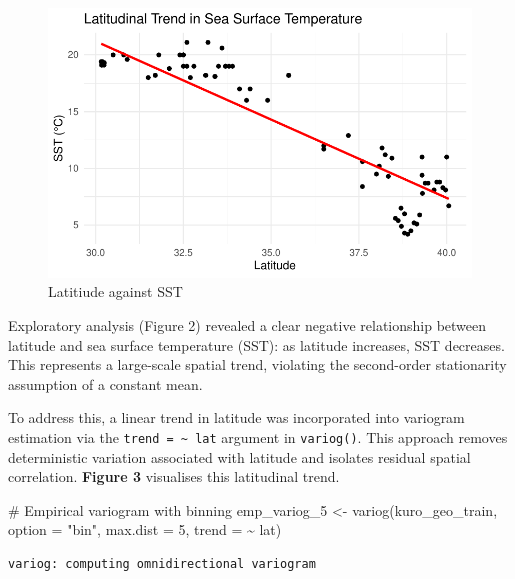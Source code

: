 \documentclass[
  11pt,
]{article}
\newenvironment{Shaded}{\begin{snugshade}}{\end{snugshade}}
\newcommand{\AttributeTok}[1]{\textcolor[rgb]{0.40,0.45,0.13}{#1}}
\newcommand{\CommentTok}[1]{\textcolor[rgb]{0.37,0.37,0.37}{#1}}
\newcommand{\DecValTok}[1]{\textcolor[rgb]{0.68,0.00,0.00}{#1}}
\newcommand{\FunctionTok}[1]{\textcolor[rgb]{0.28,0.35,0.67}{#1}}
\newcommand{\NormalTok}[1]{\textcolor[rgb]{0.00,0.23,0.31}{#1}}
\newcommand{\OtherTok}[1]{\textcolor[rgb]{0.00,0.23,0.31}{#1}}
\newcommand{\SpecialCharTok}[1]{\textcolor[rgb]{0.37,0.37,0.37}{#1}}
\newcommand{\StringTok}[1]{\textcolor[rgb]{0.13,0.47,0.30}{#1}}
\begin{document}
\begin{figure}[H]

{\centering \includegraphics{project_files/figure-pdf/unnamed-chunk-7-1.pdf}

}

\caption{Latitiude against SST}

\end{figure}%

Exploratory analysis (Figure 2) revealed a clear negative relationship
between latitude and sea surface temperature (SST): as latitude
increases, SST decreases. This represents a large-scale spatial trend,
violating the second-order stationarity assumption of a constant mean.

To address this, a linear trend in latitude was incorporated into
variogram estimation via the \texttt{trend\ =\ \textasciitilde{}\ lat}
argument in \texttt{variog()}. This approach removes deterministic
variation associated with latitude and isolates residual spatial
correlation. \textbf{Figure 3} visualises this latitudinal trend.

\begin{Shaded}
\begin{Highlighting}[]
\CommentTok{\# Empirical variogram with binning}
\NormalTok{emp\_variog\_5 }\OtherTok{\textless{}{-}} \FunctionTok{variog}\NormalTok{(kuro\_geo\_train, }\AttributeTok{option =} \StringTok{"bin"}\NormalTok{, }\AttributeTok{max.dist =} \DecValTok{5}\NormalTok{, }\AttributeTok{trend =} \SpecialCharTok{\textasciitilde{}}\NormalTok{ lat)}
\end{Highlighting}
\end{Shaded}

\begin{verbatim}
variog: computing omnidirectional variogram
\end{verbatim}
\end{document}
